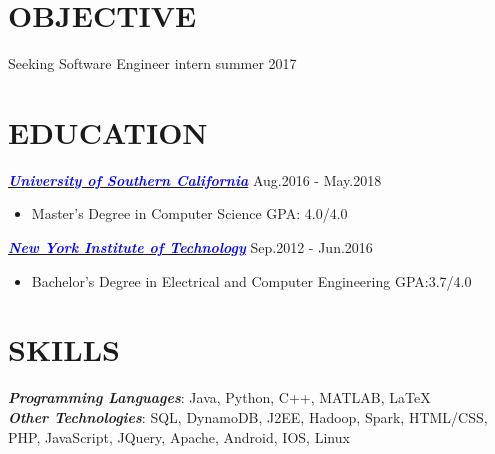 \documentclass[line,margin]{res}
\begin{document}
\address{Address: 2617 Ellendale Pl, Los Angeles, CA 90007 \quad \quad Email: \href{mailto:qchen10@nyit.edu}{\textcolor{blue}{qchen10@nyit.edu}}}
\address{\hspace{90mm} Phone: 213-713-0893}

\begin{resume}
\vspace{-2mm}
\section{OBJECTIVE}
	Seeking Software Engineer intern summer 2017
\vspace{-1.5mm}
\section{EDUCATION}
                {\sl \href{http://www.usc.edu/}{\textcolor{blue}{\textbf{University of Southern California}}}}  \hfill Aug.2016 - May.2018
                    \begin{itemize}
                    \item Master's Degree in Computer Science \quad GPA: 4.0/4.0
                    \end{itemize}
                \vspace{-2mm}
                {\sl \href{http://www.nyit.edu/}{\textcolor{blue}{\textbf{New York Institute of Technology}}}}  \hfill Sep.2012 - Jun.2016
                 \begin{itemize}
                   \item Bachelor's Degree in Electrical and Computer Engineering \quad GPA:3.7/4.0                 \end{itemize}

\vspace{-2.5mm}

\section{SKILLS}
            {\sl \textbf{Programming Languages}}:   Java, Python, C++, MATLAB, \LaTeX\\
            {\sl \textbf{Other Technologies}}:  SQL, DynamoDB, J2EE, Hadoop, Spark, HTML/CSS, PHP, JavaScript, JQuery, Apache, Android, IOS, Linux\\
\vspace{-5mm}


\end{resume}
\end{document}

